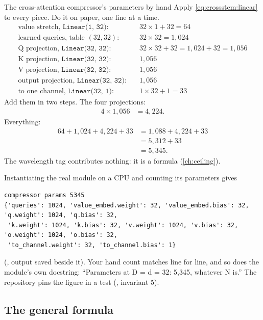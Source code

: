 \begin{worked}[label={we:crossstem:params}]{The cross-attention compressor's parameters by hand}
Apply \cref{eq:crossstem:linear} to every piece. Do it on paper, one line at a time.
\begin{align*}
  \text{value stretch, }\texttt{Linear(1, 32)}:&\quad 32\times1 + 32 = 64\\
  \text{learned queries, table }(32, 32):&\quad 32\times32 = 1{,}024\\
  \text{Q projection, }\texttt{Linear(32, 32)}:&\quad 32\times32 + 32 = 1{,}024 + 32 = 1{,}056\\
  \text{K projection, }\texttt{Linear(32, 32)}:&\quad 1{,}056\\
  \text{V projection, }\texttt{Linear(32, 32)}:&\quad 1{,}056\\
  \text{output projection, }\texttt{Linear(32, 32)}:&\quad 1{,}056\\
  \text{to one channel, }\texttt{Linear(32, 1)}:&\quad 1\times32 + 1 = 33
\end{align*}
Add them in two steps. The four projections:
\begin{align*}
  4\times1{,}056 &= 4{,}224 .
\end{align*}
Everything:
\begin{align*}
  64 + 1{,}024 + 4{,}224 + 33 &= 1{,}088 + 4{,}224 + 33\\
  &= 5{,}312 + 33\\
  &= 5{,}345 .
\end{align*}
The wavelength tag contributes nothing: it is a formula (\cref{ch:ceiling}).
\end{worked}

Instantiating the real module on a CPU and counting its parameters gives\tagC{}
\begin{lstlisting}
compressor params 5345
{'queries': 1024, 'value_embed.weight': 32, 'value_embed.bias': 32, 'q.weight': 1024, 'q.bias': 32,
 'k.weight': 1024, 'k.bias': 32, 'v.weight': 1024, 'v.bias': 32, 'o.weight': 1024, 'o.bias': 32,
 'to_channel.weight': 32, 'to_channel.bias': 1}
\end{lstlisting}
(, output saved beside it). Your hand count matches line for line, and so does the module's own docstring: ``Parameters at D = d = 32: 5,345, whatever N is.'' The repository pins the figure in a test (, invariant 5).

\subsection{The general formula}

